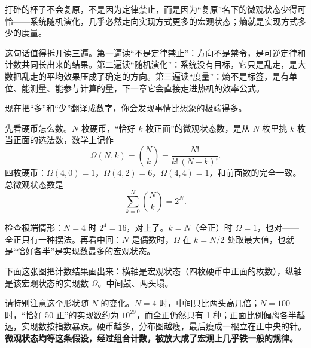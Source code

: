 
\begin{oneline}
打碎的杯子不会复原，不是因为定律禁止，而是因为“复原”名下的微观状态少得可怜——系统随机演化，几乎必然走向实现方式更多的宏观状态；熵就是实现方式多少的度量。
\end{oneline}

这句话值得拆开读三遍。第一遍读“不是定律禁止”：方向不是禁令，是可逆定律和计数共同长出来的结果。第二遍读“随机演化”：系统没有目标，它只是乱走，是大数把乱走的平均效果压成了确定的方向。第三遍读“度量”：熵不是标签，是有单位、能测量、能参与计算的量，下一章它会直接走进热机的效率公式。


现在把“多”和“少”翻译成数字，你会发现事情比想象的极端得多。

先看硬币怎么数。\(N\) 枚硬币，“恰好 \(k\) 枚正面”的微观状态数，是从 \(N\) 枚里挑 \(k\) 枚当正面的选法数，数学上记作
\[
\Omega(N,k)=\binom{N}{k}=\frac{N!}{k!\,(N-k)!}.
\]
四枚硬币：\(\Omega(4,0)=1\)，\(\Omega(4,2)=6\)，\(\Omega(4,4)=1\)，和前面数的完全一致。总微观状态数是
\[
\sum_{k=0}^{N}\binom{N}{k}=2^{N}.
\]

检查极端情形：\(N=4\) 时 \(2^4=16\)，对上了。\(k=N\)（全正）时 \(\Omega=1\)，也对——全正只有一种摆法。再看中间：\(N\) 是偶数时，\(\Omega\) 在 \(k=N/2\) 处取最大值，也就是“恰好各半”是实现数最多的宏观状态。

下面这张图把计数结果画出来：横轴是宏观状态（四枚硬币中正面的枚数），纵轴是该宏观状态的实现数 \(\Omega\)。中间鼓、两头塌。

\begin{center}
\end{center}

请特别注意这个形状随 \(N\) 的变化。\(N=4\) 时，中间只比两头高几倍；\(N=100\) 时，“恰好 50 正”的实现数约为 \(10^{29}\)，而全正仍然只有 1 种；正面比例偏离各半越远，实现数按指数暴跌。硬币越多，分布图越瘦，最后瘦成一根立在正中央的针。\textbf{微观状态均等这条假设，经过组合计数，被放大成了宏观上几乎铁一般的规律。}

